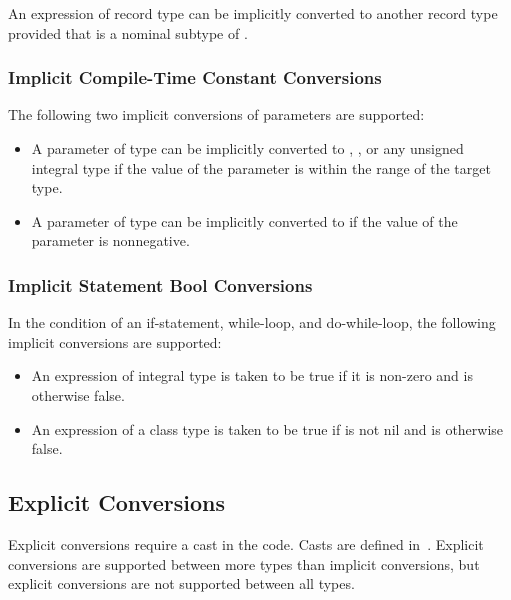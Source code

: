 An expression of record type  can be implicitly converted to
another record type  provided that  is a nominal
subtype of .

\subsubsection{Implicit Compile-Time Constant Conversions}
\label{Implicit_Compile_Time_Constant_Conversions}

The following two implicit conversions of parameters are supported:
\begin{itemize}
\item A parameter of type  can be implicitly converted
to , , or any unsigned integral type if the
value of the parameter is within the range of the target type.
\item A parameter of type  can be implicitly converted
to  if the value of the parameter is nonnegative.
\end{itemize}

\subsubsection{Implicit Statement Bool Conversions}
\label{Implicit_Statement_Bool_Conversions}

In the condition of an if-statement, while-loop, and do-while-loop,
the following implicit conversions are supported:
\begin{itemize}
\item An expression of integral type is taken to be true if it is non-zero and is otherwise false.
\item An expression of a class type is taken to be true if is not nil and is otherwise false.
\end{itemize}

\subsection{Explicit Conversions}
\label{Explicit_Conversions}

Explicit conversions require a cast in the code.  Casts are defined
in~.  Explicit conversions are supported between more
types than implicit conversions, but explicit conversions are not
supported between all types.

